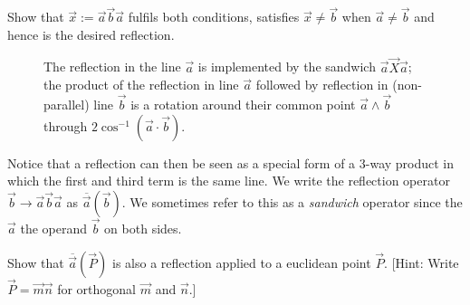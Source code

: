 \documentclass{birkjour}
\newcommand{\mydogblue}{{\color{gray} $\square$~~}}
\begin{document}
{ \myexercise  Show that $\vec{x} := \vec{a}\vec{b}\vec{a}$ fulfils both conditions, satisfies $\vec{x} \neq \vec{b}$ when $\vec{a} \neq \vec{b}$ and hence is the desired reflection. %
  \begin{figure}
   \centering
{\setlength\fboxsep{0pt}}
\caption{The reflection in the line $\vec{a}$ is implemented by the sandwich $\vec{a}\vec{X}\vec{a}$; the product of the reflection in line $\vec{a}$ followed by reflection in (non-parallel) line $\vec{b}$ is a rotation around their common point $\vec{a}\wedge\vec{b}$ through $2 \cos^{-1}(\vec{a}\cdot\vec{b})$.}
\label{fig:rotationab}
\end{figure}


Notice that a reflection can then be seen as a special form of a 3-way product in which the first and third term is the same line.
 We write the reflection operator $\vec{b} \rightarrow \vec{a}\vec{b} \vec{a}$ as $\overline{\vec{a}}(\vec{b})$.   We sometimes refer to this as a \emph{sandwich} operator since the $\vec{a}$  the operand $\vec{b}$ on both sides. 

\myexercise  Show that $\overline{\vec{a}}(\vec{P})$ is also a reflection applied to a euclidean point $\vec{P}$. [Hint: Write $\vec{P}= \vec{m}\vec{n}$ for orthogonal $\vec{m}$ and $\vec{n}$.] %

}
\end{document}
